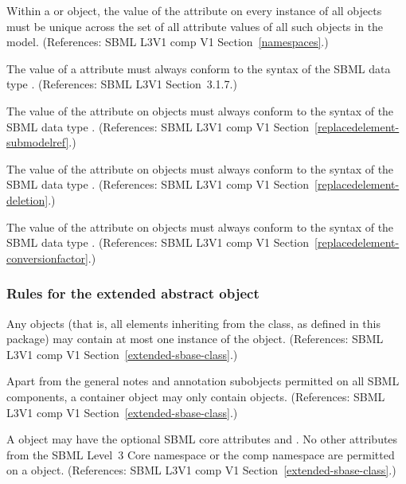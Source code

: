 \begin{sbmlenum}
 {  Within a \Model or \ExternalModelDefinition
  object, the value of the attribute  on every instance
  of all \Port objects must be unique across the set of all
   attribute values of all such objects in the model.
  (References: SBML L3V1 comp V1 Section~\ref{namespaces}.) }


 { The value of a  attribute must
  always conform to the syntax of the SBML data type .
  (References: SBML L3V1 Section~3.1.7.)}

  
 { The value of the  attribute on
  \ReplacedElement objects must always conform to the syntax of
  the SBML data type .
  (References: SBML L3V1 comp V1 Section~\ref{replacedelement-submodelref}.) }
 
  
 { The value of the  attribute on
  \ReplacedElement objects must always conform to the syntax of
  the SBML data type .
  (References: SBML L3V1 comp V1 Section~\ref{replacedelement-deletion}.) }

  
 { The value of the  attribute on
  \ReplacedElement objects must always conform to the syntax of
  the SBML data type .
  (References: SBML L3V1 comp V1 Section~\ref{replacedelement-conversionfactor}.) }
  

\end{sbmlenum} \subsubsection*{Rules for the extended  abstract object} \begin{sbmlenum}

 { Any \SBase objects (that is, all elements inheriting
  from the \SBase class, as defined in this package) may contain at most one 
  instance of the \ListOfReplacedElements object.
  (References: SBML L3V1 comp V1 Section~\ref{extended-sbase-class}.) }


 { Apart from the general notes and annotation
  subobjects permitted on all SBML components, a \ListOfReplacedElements
  container object may only contain \ReplacedElement objects. 
  (References: SBML L3V1 comp V1 Section~\ref{extended-sbase-class}.) }


 { A \ListOfReplacedElements object may have the optional 
  SBML core attributes  and .  No other attributes 
  from the SBML Level~3 Core namespace or the comp namespace are permitted on 
  a \ListOfReplacedElements object. 
  (References: SBML L3V1 comp V1 Section~\ref{extended-sbase-class}.) }



\end{sbmlenum}
